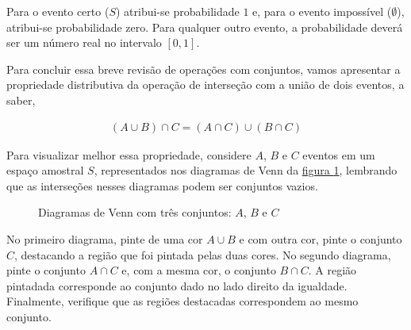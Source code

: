 Para o evento certo (\(S\)) atribui-se probabilidade $1$ e, para o evento impossível (\(\emptyset\)), atribui-se probabilidade zero. Para qualquer outro evento, a probabilidade deverá ser um número real no intervalo $[0,1]$.

Para concluir essa breve revisão de operações com conjuntos, vamos apresentar a propriedade distributiva da operação de interseção com a união de dois eventos, a saber,

\begin{equation*}
\begin{split}(A\cup B)\cap C=(A\cap C)\cup (B\cap C)\end{split}
\end{equation*}

Para visualizar melhor essa propriedade, considere $A$, $B$ e $C$ eventos em um espaço amostral $S$, representados nos diagramas de Venn da \hyperref[diagramasvenn2]{figura \ref{diagramasvenn2}}, lembrando que as interseções nesses diagramas podem ser conjuntos vazios.

\begin{figure}[H]
\centering
\begin{minipage}{0.35\textwidth}
\centering
{}

\end{minipage}
\begin{minipage}{0.35\textwidth}
\centering
{}

\end{minipage}
\caption{Diagramas de Venn com três conjuntos: \(A\), \(B\)  e \(C\)}
\label{diagramasvenn2}
\end{figure}


No primeiro diagrama, pinte de uma cor \(A\cup B\) e com outra cor, pinte o conjunto \(C\), destacando a região que foi pintada pelas duas cores. No segundo diagrama, pinte o conjunto \(A\cap C\) e, com a mesma cor,  o conjunto \(B\cap C\). A região pintadada corresponde ao conjunto dado no lado direito da igualdade. Finalmente, verifique que as regiões destacadas correspondem ao mesmo conjunto.

